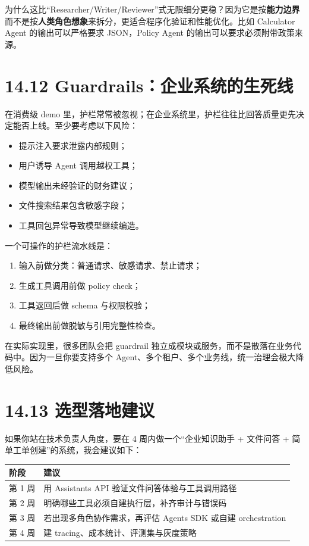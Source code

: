 为什么这比``Researcher/Writer/Reviewer''式无限细分更稳？因为它是按\textbf{能力边界}而不是按\textbf{人类角色想象}来拆分，更适合程序化验证和性能优化。比如 Calculator Agent 的输出可以严格要求 JSON，Policy Agent 的输出可以要求必须附带政策来源。


\section{14.12 Guardrails：企业系统的生死线}

在消费级 demo 里，护栏常常被忽视；在企业系统里，护栏往往比回答质量更先决定能否上线。至少要考虑以下风险：


\begin{itemize}[leftmargin=2em]
\item 提示注入要求泄露内部规则；
\item 用户诱导 Agent 调用越权工具；
\item 模型输出未经验证的财务建议；
\item 文件搜索结果包含敏感字段；
\item 工具回包异常导致模型继续编造。
\end{itemize}

一个可操作的护栏流水线是：


\begin{enumerate}[leftmargin=2em]
\item 输入前做分类：普通请求、敏感请求、禁止请求；
\item 生成工具调用前做 policy check；
\item 工具返回后做 schema 与权限校验；
\item 最终输出前做脱敏与引用完整性检查。
\end{enumerate}

在实际实现里，很多团队会把 guardrail 独立成模块或服务，而不是散落在业务代码中。因为一旦你要支持多个 Agent、多个租户、多个业务线，统一治理会极大降低风险。


\section{14.13 选型落地建议}

如果你站在技术负责人角度，要在 4 周内做一个``企业知识助手 + 文件问答 + 简单工单创建''的系统，我会建议如下：


\begingroup
\scriptsize
\setlength{\tabcolsep}{3pt}
\begin{longtable}{|p{}|p{}|}
\hline
阶段 & 建议 \\ \hline
第 1 周 & 用 Assistants API 验证文件问答体验与工具调用路径 \\ \hline
第 2 周 & 明确哪些工具必须自建执行层，补齐审计与错误码 \\ \hline
第 3 周 & 若出现多角色协作需求，再评估 Agents SDK 或自建 orchestration \\ \hline
第 4 周 & 建 tracing、成本统计、评测集与灰度策略 \\ \hline
\end{longtable}
\endgroup

